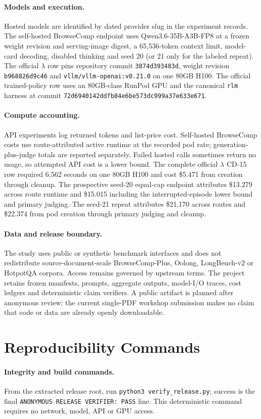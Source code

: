 \paragraph{Models and execution.}
Hosted models are identified by dated provider slug in the experiment records. The self-hosted BrowseComp endpoint uses Qwen3.6-35B-A3B-FP8 at a frozen weight revision and serving-image digest, a 65,536-token context limit, model-card decoding, disabled thinking and seed 20 (or 21 only for the labeled repeat). The official $\lambda$ row pins repository commit \texttt{3874d393483d}, weight revision \texttt{b968826d9c46} and \texttt{vllm/vllm-openai:v0.21.0} on one 80GB H100. The official trained-policy row uses an 80GB-class RunPod GPU and the canonical \texttt{rlm} harness at commit \texttt{72d6940142ddfb84e6be573dc999a37e633e671}.

\paragraph{Compute accounting.}
API experiments log returned tokens and list-price cost. Self-hosted BrowseComp costs use route-attributed active runtime at the recorded pod rate; generation-plus-judge totals are reported separately. Failed hosted calls sometimes return no usage, so attempted API cost is a lower bound. The complete official $\lambda$ CD-15 row required 6,562 seconds on one 80GB H100 and cost \$5.471 from creation through cleanup. The prospective seed-20 equal-cap endpoint attributes \$13.279 across route runtime and \$15.015 including the interrupted-episode lower bound and primary judging. The seed-21 repeat attributes \$21.170 across routes and \$22.374 from pod creation through primary judging and cleanup.

\paragraph{Data and release boundary.}
The study uses public or synthetic benchmark interfaces and does not redistribute source-document-scale BrowseComp-Plus, Oolong, LongBench-v2 or HotpotQA corpora. Access remains governed by upstream terms. The project retains frozen manifests, prompts, aggregate outputs, model-I/O traces, cost ledgers and deterministic claim verifiers. A public artifact is planned after anonymous review; the current single-PDF workshop submission makes no claim that code or data are already openly downloadable.

\FloatBarrier
\section{Reproducibility Commands}

\paragraph{Integrity and build commands.}
From the extracted release root, run \texttt{python3 verify\_release.py};
success is the final \texttt{ANONYMOUS RELEASE VERIFIER: PASS} line. This
deterministic command requires no network, model, API or GPU access.
